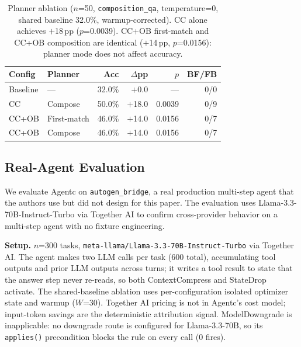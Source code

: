 \begin{table}[t]
\caption{Planner ablation ($n$=50, \texttt{composition\_qa}, temperature=0, shared
baseline 32.0\%, warmup-corrected). CC alone achieves $+$18\,pp ($p$=0.0039).
CC+OB first-match and CC+OB composition are identical ($+$14\,pp, $p$=0.0156):
planner mode does not affect accuracy.}
\label{tab:planner-ablation}
\small
\begin{tabularx}{\columnwidth}{@{} X l r r r r @{}}
\toprule
Config & Planner & Acc & $\Delta$pp & $p$ & BF/FB \\
\midrule
Baseline & ---         & 32.0\% & $+$0.0  & ---    & 0/0 \\
CC       & Compose     & 50.0\% & $+$18.0 & 0.0039 & 0/9 \\
CC+OB    & First-match & 46.0\% & $+$14.0 & 0.0156 & 0/7 \\
CC+OB    & Compose     & 46.0\% & $+$14.0 & 0.0156 & 0/7 \\
\bottomrule
\end{tabularx}
\end{table}

\subsection{Real-Agent Evaluation}
\label{sec:eval-realagent}

We evaluate Agentc on \texttt{autogen\_bridge}, a real production multi-step agent
that the authors use but did not design for this paper. The evaluation uses
Llama-3.3-70B-Instruct-Turbo via Together AI to confirm cross-provider behavior on
a multi-step agent with no fixture engineering.

\textbf{Setup.} $n$=300 tasks, \texttt{meta-llama/Llama-3.3-70B-Instruct-Turbo} via
Together AI. The agent makes two LLM calls per task (600 total), accumulating tool
outputs and prior LLM outputs across turns; it writes a tool result to state that the
answer step never re-reads, so both ContextCompress and StateDrop activate. The
shared-baseline ablation uses per-configuration isolated optimizer state and warmup
($W$=30). Together AI pricing is not in Agentc's cost model; input-token savings are
the deterministic attribution signal. ModelDowngrade is inapplicable: no downgrade
route is configured for Llama-3.3-70B, so its \texttt{applies()} precondition blocks
the rule on every call (0 fires).

